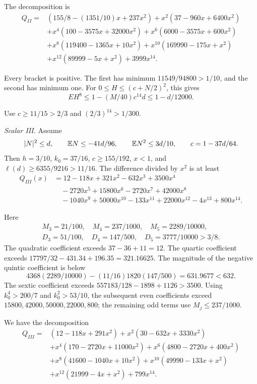 The decomposition is
\[
\begin{aligned}
Q_{II}={}&(155/8-(1351/10)x+237x^2)+x^2(37-960x+6400x^2)\\
&+x^4(100-3575x+32000x^2)+x^6(6000-3575x+600x^2)\\
&+x^8(119400-1365x+10x^2)+x^{10}(169990-175x+x^2)\\
&+x^{12}(89999-5x+x^2)+3999x^{14}.
\end{aligned}
\tag{Q58O.3.4}\label{eq:Q58O:3.4}
\]

Every bracket is positive. The first has minimum
\(11549/94800>\allowbreak 1/10\), and the second has minimum one.
For \(0\le\allowbreak  H\le\allowbreak (c+N/2)^2\), this gives
\[
EH^8\le1-(M/40)c^{14}d\le1-d/12000.
\tag{Q58O.3.5}\label{eq:Q58O:3.5}
\]

Use \(c\ge\allowbreak 11/15>\allowbreak 2/3\) and \((2/3)^{14}>\allowbreak 1/300\).

\emph{Scalar III.}
Assume
\[
|N|^2\le d,\qquad \mathbb E N\le-41d/96,\qquad
\mathbb E N^2\le3d/10,\qquad c=1-37d/64.
\]
Then \(h=\allowbreak 3/10\), \(k_0=\allowbreak 37/16\), \(c\ge\allowbreak 155/192\), \(x<\allowbreak 1\), and
\(\ell(d)\ge\allowbreak 6355/9216>\allowbreak 11/16\).
The difference divided by \(x^2\) is at least
\[
\begin{aligned}
Q_{III}(x)&=12-118x+321x^2-632x^3+3500x^4\\
&\quad -2720x^5+15800x^6-2720x^7+42000x^8\\
&\quad -1040x^9+50000x^{10}-133x^{11}+22000x^{12}-4x^{13}+800x^{14}.
\end{aligned}
\]

Here
\[
\begin{gathered}
M_3=21/100,\quad M_4=237/1000,\quad M_5=2289/10000,\quad\\
D_3=51/100,\quad D_4=147/500,\quad D_5=3777/10000>3/8.
\end{gathered}
\]
The quadratic coefficient exceeds \(37-36+11=\allowbreak 12\).
The quartic coefficient exceeds
\(17797/32-431.34+196.35=\allowbreak 321.16625\).
The magnitude of the negative quintic coefficient is below
\[
4368(2289/10000)-(11/16)1820(147/500)=631.9677<632.
\]
The sextic coefficient exceeds \(557183/128-1898+1126>\allowbreak 3500\).
Using \(k_0^4>\allowbreak 200/7\) and \(k_0^2>\allowbreak 53/10\), the subsequent even coefficients exceed
\(15800,\allowbreak 42000,\allowbreak 50000,\allowbreak 22000,\allowbreak 800\); the remaining odd terms use
\(M_j\le\allowbreak 237/1000\).

We have the decomposition
\[
\begin{aligned}
Q_{III}={}&(12-118x+291x^2)+x^2(30-632x+3330x^2)\\
&+x^4(170-2720x+11000x^2)+x^6(4800-2720x+400x^2)\\
&+x^8(41600-1040x+10x^2)+x^{10}(49990-133x+x^2)\\
&+x^{12}(21999-4x+x^2)+799x^{14}.
\end{aligned}
\tag{Q58O.3.6}\label{eq:Q58O:3.6}
\]

